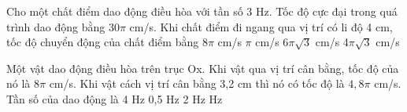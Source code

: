 \begin{vidu} %
Cho một chất điểm dao động điều hòa với tần số 3 Hz. Tốc độ cực đại trong quá trình dao động bằng 30$\pi$ cm/s. Khi chất điểm đi ngang qua vị trí có li độ 4 cm, tốc độ chuyển động của chất điểm bằng
\choice
{8$\pi$ cm/s}
{$\pi$ cm/s}
{6$\pi \sqrt{3}$ cm/s}
{4$\pi \sqrt{3}$ cm/s}
\end{vidu} %
\begin{vidu}%
Một vật dao động điều hòa trên trục Ox. Khi vật qua vị trí cân bằng, tốc độ của nó là $8\pi$  cm/s. Khi vật cách vị trí cân bằng 3,2 cm thì nó có tốc độ là $4,8\pi$  cm/s. Tần số của dao động là
\choice
{4 Hz}
{0,5 Hz}
{2 Hz}
{ Hz}
\end{vidu} %

